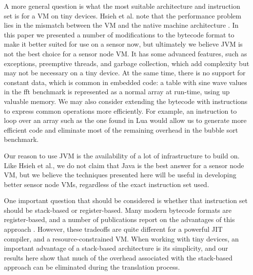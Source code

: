 A more general question is what the most suitable architecture and instruction set is for a VM on tiny devices. Hsieh et al. note that the performance problem lies in the mismatch between the VM and the native machine architecture \cite{Hsieh:1996cy}. In this paper we presented a number of modifications to the bytecode format to make it better suited for use on a sensor now, but ultimately we believe JVM is not the best choice for a sensor node VM. It has some advanced features, such as exceptions, preemptive threads, and garbage collection, which add complexity but may not be necessary on a tiny device. At the same time, there is no support for constant data, which is common in embedded code: a table with sine wave values in the fft benchmark is represented as a normal array at run-time, using up valuable memory.
We may also consider extending the bytecode with instructions to express common operations more efficiently. For example, an instruction to loop over an array such as the one found in Lua \cite{Lua:2005} would allow us to generate more efficient code and eliminate most of the remaining overhead in the bubble sort benchmark.


Our reason to use JVM is the availability of a lot of infrastructure to build on. Like Hsieh et al., we do not claim that Java is the best answer for a sensor node VM, but we believe the techniques presented here will be useful in developing better sensor node VMs, regardless of the exact instruction set used.

One important question that should be considered is whether that instruction set should be stack-based or register-based. Many modern bytecode formats are register-based, and a number of publications report on the advantages of this approach \cite{Zhang:2012wf, Shi:2005ba}. However, these tradeoffs are quite different for a powerful JIT compiler, and a resource-constrained VM. When working with tiny devices, an important advantage of a stack-based architecture is its simplicity, and our results here show that much of the overhead associated with the stack-based approach can be eliminated during the translation process.




